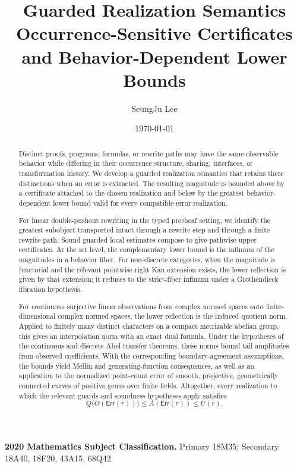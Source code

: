 \documentclass[12pt,a4paper,twoside]{extarticle}
\title{\vspace{-7mm}\bfseries\fontsize{15}{16}\selectfont
Guarded Realization Semantics\\[-1mm]
\normalfont\fontsize{9.5}{10.5}\selectfont
Occurrence-Sensitive Certificates and Behavior-Dependent Lower Bounds}
\author{SeungJu Lee}
\date{\today}
\theoremstyle{compactplain}
\theoremstyle{compactdef}
\newcommand{\Err}{\mathsf{Err}}
\begin{document}
\maketitle
\vspace{-5mm}


\begin{abstract}
Distinct proofs, programs, formulas, or rewrite paths may have the same
observable behavior while differing in their occurrence structure, sharing,
interfaces, or transformation history.  We develop a guarded realization
semantics that retains these distinctions when an error is extracted.  The
resulting magnitude is bounded above by a certificate attached to the chosen
realization and below by the greatest behavior-dependent lower bound valid for
every compatible error realization.

For linear double-pushout rewriting in the typed presheaf setting, we identify
the greatest subobject transported intact through a rewrite step and through a
finite rewrite path.  Sound guarded local estimates compose to give pathwise
upper certificates.  At the set level, the complementary lower bound is the
infimum of the magnitudes in a behavior fiber.  For non-discrete categories,
when the magnitude is functorial and the relevant pointwise right Kan extension
exists, the lower reflection is given by that extension; it reduces to the
strict-fiber infimum under a Grothendieck fibration hypothesis.

For continuous surjective linear observations from complex normed spaces onto
finite-dimensional complex normed spaces, the lower reflection is the induced
quotient norm.  Applied to finitely many distinct characters on a compact
metrizable abelian group, this gives an interpolation norm with an exact dual
formula.  Under the hypotheses of the continuous and discrete Abel transfer
theorems, these norms bound tail amplitudes from observed coefficients.  With
the corresponding boundary-agreement assumptions, the bounds yield Mellin and
generating-function consequences, as well as an application to the normalized
point-count error of smooth, projective, geometrically connected curves of
positive genus over finite fields.  Altogether, every realization to which the relevant guards and soundness
hypotheses apply satisfies
\[
  Q\bigl(O(\Err(r))\bigr)
  \leq A(\Err(r))
  \leq U(r).
\]
\end{abstract}

\noindent\textbf{2020 Mathematics Subject Classification.}
Primary 18M35; Secondary 18A40, 18F20, 43A15, 68Q42.
\end{document}
